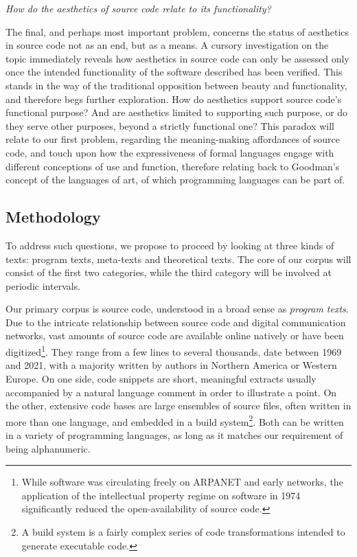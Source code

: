 \vspace*{1\baselineskip}

\emph{How do the aesthetics of source code relate to its functionality?}

The final, and perhaps most important problem, concerns the status of aesthetics in source code not as an end, but as a means. A cursory investigation on the topic immediately reveals how aesthetics in source code can only be assessed only once the intended functionality of the software described has been verified. This stands in the way of the traditional opposition between beauty and functionality, and therefore begs further exploration. How do aesthetics support source code's functional purpose? And are aesthetics limited to supporting such purpose, or do they serve other purposes, beyond a strictly functional one? This paradox will relate to our first problem, regarding the meaning-making affordances of source code, and touch upon how the expressiveness of formal languages engage with different conceptions of use and function, therefore relating back to Goodman's concept of the languages of art, of which programming languages can be part of.

\subsection{Methodology}

To address such questions, we propose to proceed by looking at three kinds of texts: program texts, meta-texts and theoretical texts. The core of our corpus will consist of the first two categories, while the third category will be involved at periodic intervals.

Our primary corpus is source code, understood in a broad sense as \emph{program texts}. Due to the intricate relationship between source code and digital communication networks, vast amounts of source code are available online natively or have been digitized\footnote{While software was circulating freely on ARPANET and early networks, the application of the intellectual property regime on software in 1974 significantly reduced the open-availability of source code.}. They range from a few lines to several thousands, date between 1969 and 2021, with a majority written by authors in Northern America or Western Europe. On one side, code snippets are short, meaningful extracts usually accompanied by a natural language comment in order to illustrate a point. On the other, extensive code bases are large ensembles of source files, often written in more than one language, and embedded in a build system\footnote{A build system is a fairly complex series of code transformations intended to generate executable code.}. Both can be written in a variety of programming languages, as long as it matches our requirement of being alphanumeric.


